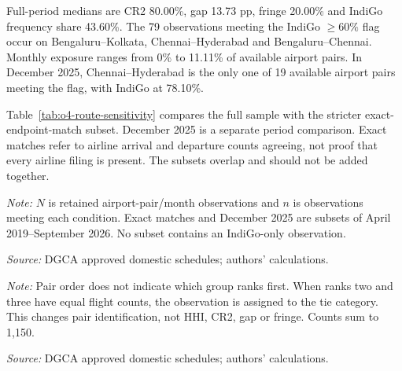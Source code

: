 \documentclass[12pt,a4paper]{article}
\begin{document}
Full-period medians are CR2 80.00\%, gap 13.73 pp, fringe 20.00\% and IndiGo frequency share 43.60\%. The 79 observations meeting the IndiGo $\geq60\%$ flag occur on Bengaluru--Kolkata, Chennai--Hyderabad and Bengaluru--Chennai. Monthly exposure ranges from 0\% to 11.11\% of available airport pairs. In December 2025, Chennai--Hyderabad is the only one of 19 available airport pairs meeting the flag, with IndiGo at 78.10\%.

Table~\ref{tab:o4-route-sensitivity} compares the full sample with the stricter exact-endpoint-match subset. December 2025 is a separate period comparison. Exact matches refer to airline arrival and departure counts agreeing, not proof that every airline filing is present. The subsets overlap and should not be added together.

\begin{minipage}{\linewidth}
\captionsetup{font=small,labelfont=bf,justification=raggedright,singlelinecheck=false,hypcap=false}
\label{tab:o4-route-sensitivity}
\centering
{\small{}\setlength{\tabcolsep}{4pt}\par}
\vspace{4pt}
{\footnotesize{}\raggedright\textit{Note:} $N$ is retained airport-pair/month observations and $n$ is observations meeting each condition. Exact matches and December 2025 are subsets of April 2019--September 2026. No subset contains an IndiGo-only observation.\par
\textit{Source:} DGCA approved domestic schedules; authors' calculations.\par}
\end{minipage}

\begin{minipage}{\linewidth}
\captionsetup{font=small,labelfont=bf,justification=raggedright,singlelinecheck=false,hypcap=false}
\label{tab:o4-route-leaders}
\centering
{\small{}\setlength{\tabcolsep}{4pt}\par}
\vspace{4pt}
{\footnotesize{}\raggedright\textit{Note:} Pair order does not indicate which group ranks first. When ranks two and three have equal flight counts, the observation is assigned to the tie category. This changes pair identification, not HHI, CR2, gap or fringe. Counts sum to 1,150.\par
\textit{Source:} DGCA approved domestic schedules; authors' calculations.\par}
\end{minipage}
\end{document}
